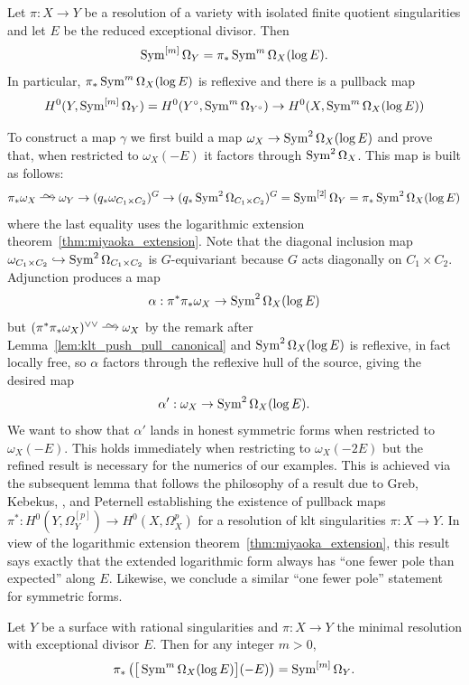 \documentclass[main.tex]{subfiles}
\begin{document}
\begin{theorem} \cite[Corollary 3.2]{greb:extension_theorems} \label{thm:miyaoka_extension}
Let $\pi : X \to Y$ be a resolution of a variety with isolated finite quotient singularities and let $E$ be the reduced exceptional divisor. Then 
\[ \operatorname{\mathrm{Sym}}^{[m]}\Omega_Y = \pi_* \operatorname{\mathrm{Sym}}^m\Omega_X(\log{E}). \]
In particular, $\pi_* \operatorname{\mathrm{Sym}}^{m} \Omega_X(\log{E})$ is reflexive and there is a pullback map
\[ H^0(Y, \operatorname{\mathrm{Sym}}^{[m]}\Omega_Y) = H^0(Y^{\circ}, \operatorname{\mathrm{Sym}}^m \Omega_{Y^\circ}) \to H^0(X, \operatorname{\mathrm{Sym}}^{m} \Omega_X(\log{E})) \]
\end{theorem}

To construct a map $\gamma$ we first build a map $\omega_X \to \operatorname{\mathrm{Sym}}^2 \Omega_X(\log{E})$ and prove that, when restricted to $\omega_X(-E)$ it factors through $\operatorname{\mathrm{Sym}}^2 \Omega_X$. This map is built as follows:
\[ \pi_* \omega_X \iso \omega_Y \to (q_* \omega_{C_1 \times C_2})^G \to (q_* \Sym^2 \Omega_{C_1 \times C_2})^G = \Sym^{[2]} \Omega_Y = \pi_* \Sym^{2} \Omega_X(\log{E}) \]
where the last equality uses the logarithmic extension theorem~\ref{thm:miyaoka_extension}.  Note that the diagonal inclusion map $\omega_{C_1 \times C_2} \hookrightarrow \operatorname{\mathrm{Sym}}^{2} \Omega_{C_1 \times C_2}$ is $G$-equivariant because $G$ acts diagonally on $C_1 \times C_2$. Adjunction produces a map
\[ \alpha : \pi^* \pi_* \omega_X \to \operatorname{\mathrm{Sym}}^{2} \Omega_X(\log{E}) \]
but $(\pi^* \pi_* \omega_X)^{\vee \vee} \iso \omega_X$ by the remark after Lemma~\ref{lem:klt_push_pull_canonical} and $\operatorname{\mathrm{Sym}}^{2} \Omega_X(\log{E})$ is reflexive, in fact locally free, so $\alpha$ factors through the reflexive hull of the source, giving the desired map
\[ \alpha' : \omega_X \to \operatorname{\mathrm{Sym}}^{2} \Omega_X(\log{E}). \]
We want to show that $\alpha'$ lands in honest symmetric forms when restricted to $\omega_X(-E)$. This holds immediately when restricting to $\omega_X(-2E)$ but the refined result is necessary for the numerics of our examples. This is achieved via the subsequent lemma that follows the philosophy of a result due to Greb, Kebekus, \Kovacs, and Peternell \cite{greb:differential_forms} establishing the existence of pullback maps $\pi^* : H^0(Y, \Omega_Y^{[p]}) \to H^0(X, \Omega_X^p)$ for a resolution of klt singularities $\pi : X \to Y$. In view of the logarithmic extension theorem~\ref{thm:miyaoka_extension}, this result says exactly that the extended logarithmic form always has ``one fewer pole than expected'' along $E$. Likewise, we conclude a similar ``one fewer pole'' statement for symmetric forms.

\begin{lemma} \label{lem:pole_order}
Let $Y$ be a surface with rational singularities and $\pi : X \to Y$ the minimal resolution with exceptional divisor $E$. Then for any integer $m > 0$,
\[ \pi_* \left( \big[\operatorname{\mathrm{Sym}}^m \Omega_X(\log{E}) \big](-E) \right) = \operatorname{\mathrm{Sym}}^{[m]} \Omega_Y. \]
\end{lemma}
\end{document}

